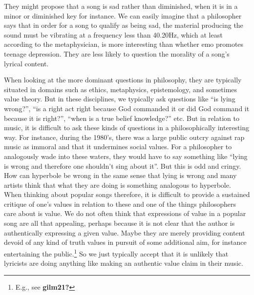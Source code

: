 \documentclass[phdthesis,12pt,final]{wuthesis}
\theoremstyle{definition}
\theoremstyle{definition}
\theoremstyle{definition}
\theoremstyle{definition}
\theoremstyle{remark}
\begin{document}
They might propose that a song is sad rather than diminished, when it is in a minor or diminished key for instance. We can easily imagine that a philosopher says that in order for a song to qualify as being sad, the material producing the sound must be vibrating at a frequency less than 40.20Hz, which at least according to the metaphysician, is more interesting than whether emo promotes teenage depression. They are less likely to question the morality of a song's lyrical content.

When looking at the more dominant questions in philosophy, they are typically situated in domains such as ethics, metaphysics, epistemology, and sometimes value theory. But in these disciplines, we typically ask questions like ``is lying wrong?'', ``is a right act right because God commanded it or did God command it because it is right?'', ``when is a true belief knowledge?'' etc. But in relation to music, it is difficult to ask these kinds of questions in a philosophically interesting way. For instance, during the 1980's, there was a large public outcry against rap music as immoral and that it undermines social values. For a philosopher to analogously wade into these waters, they would have to say something like ``lying is wrong and therefore one shouldn't sing about it''. But this is odd and cringy. How can hyperbole be wrong in the same sense that lying is wrong and many artists think that what they are doing is something analogous to hyperbole. When thinking about popular songs therefore, it is difficult to provide a sustained critique of one's values in relation to these and one of the things philosophers care about is value. We do not often think that expressions of value in a popular song are all that appealing, perhaps because it is not clear that the author is authentically expressing a given value. Maybe they are merely providing content devoid of any kind of truth values in pursuit of some additional aim, for instance entertaining the public.\footnote{E.g., see \textbf{gilm21?}} So we just typically accept that it is unlikely that lyricists are doing anything like making an authentic value claim in their music.
\end{document}
